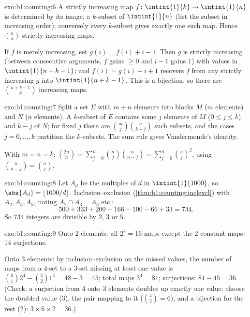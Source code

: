 \begin{solution}{exo:b1:counting:6}
A strictly increasing map $f \colon \intint{1}{k} \to \intint{1}{n}$
is determined by its image, a $k$-subset of $\intint{1}{n}$ (list the
subset in increasing order); conversely every $k$-subset gives exactly
one such map. Hence $\binom nk$ strictly increasing maps.

If $f$ is merely increasing, set $g(i) = f(i) + i - 1$. Then $g$ is
strictly increasing (between consecutive arguments, $f$ gains $\geq 0$
and $i - 1$ gains $1$) with values in $\intint{1}{n + k - 1}$; and
$f(i) = g(i) - i + 1$ recovers $f$ from any strictly increasing $g$
into $\intint{1}{n+k-1}$. This is a bijection, so there are
$\binom{n + k - 1}{k}$ increasing maps.
\end{solution}

\begin{solution}{exo:b1:counting:7}
Split a set $E$ with $m + n$ elements into blocks $M$ ($m$ elements)
and $N$ ($n$ elements). A $k$-subset of $E$ contains some $j$ elements
of $M$ ($0 \leq j \leq k$) and $k - j$ of $N$; for fixed $j$ there are
$\binom mj \binom{n}{k-j}$ such subsets, and the cases $j = 0, \dots,
k$ partition the $k$-subsets. The sum rule gives Vandermonde's
identity.

With $m = n = k$: $\binom{2n}{n} = \sum_{j=0}^{n} \binom nj
\binom{n}{n-j} = \sum_{j=0}^{n} \binom nj^2$, using $\binom{n}{n-j} =
\binom nj$.
\end{solution}

\begin{solution}{exo:b1:counting:8}
Let $A_d$ be the multiples of $d$ in $\intint{1}{1000}$, so
$\abs{A_d} = \lfloor 1000/d \rfloor$. Inclusion--exclusion
(\cref{thm:b1:counting:inclexcl}) with $A_2, A_3, A_5$, noting
$A_2 \cap A_3 = A_6$ etc.:
\[
500 + 333 + 200 - 166 - 100 - 66 + 33 = 734 .
\]
So $734$ integers are divisible by $2$, $3$ or $5$.
\end{solution}

\begin{solution}{exo:b1:counting:9}
Onto $2$ elements: all $2^4 = 16$ maps except the $2$ constant maps:
$14$ surjections.

Onto $3$ elements: by inclusion--exclusion on the missed values, the
number of maps from a $4$-set to a $3$-set missing at least one value
is $\binom 31 2^4 - \binom 32 1^4 = 48 - 3 = 45$; total maps $3^4 =
81$; surjections: $81 - 45 = 36$. (Check: a surjection from $4$ onto
$3$ elements doubles up exactly one value: choose the doubled value
($3$), the pair mapping to it ($\binom 42 = 6$), and a bijection for
the rest ($2$): $3 \times 6 \times 2 = 36$.)
\end{solution}

